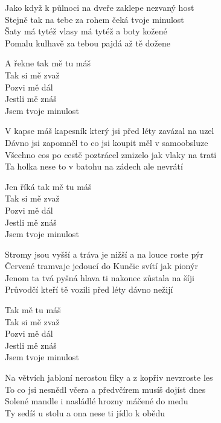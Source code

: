 \begin{text}
\hfill\break
\hfill\break
\hfill\break
Jako když k půlnoci na dveře zaklepe nezvaný host\\
Stejně tak na tebe za rohem čeká tvoje minulost \\
Šaty má tytéž vlasy má tytéž a boty kožené\\
Pomalu kulhavě za tebou pajdá až tě dožene

\vin A řekne tak mě tu máš \\
\vin Tak si mě zvaž\\
\vin Pozvi mě dál \\
\vin Jestli mě znáš\\
\vin Jsem tvoje minulost

V kapse máš kapesník který jsi před léty zavázal na uzel\\
Dávno jsi zapomněl to co jsi koupit měl v samoobsluze\\
Všechno cos po cestě poztrácel zmizelo jak vlaky na trati\\
Ta holka nese to v batohu na zádech ale nevrátí

\vin Jen říká tak mě tu máš \\
\vin Tak si mě zvaž\\
\vin Pozvi mě dál \\
\vin Jestli mě znáš\\
\vin Jsem tvoje minulost

Stromy jsou vyšší a tráva je nižší a na louce roste pýr\\
Červené tramvaje jedoucí do Kunčic svítí jak pionýr\\
Jenom ta tvá pyšná hlava ti nakonec zůstala na šíji\\
Průvodčí kteří tě vozili před léty dávno nežijí

\vin Tak mě tu máš \\
\vin Tak si mě zvaž\\
\vin Pozvi mě dál \\
\vin Jestli mě znáš\\
\vin Jsem tvoje minulost

Na větvích jabloní nerostou fíky a z kopřiv nevzroste les\\
To co jsi nesnědl včera a předvčírem musíš dojíst dnes\\
Solené mandle i nasládlé hrozny máčené do medu\\
Ty sedíš u stolu a ona nese ti jídlo k obědu


\end{text}
